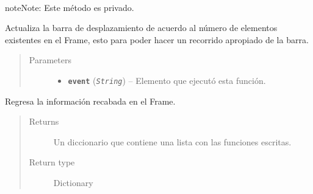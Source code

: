 \documentclass[class=report, crop=false]{standalone}
\begin{document}
\begin{fulllineitems}
\begin{fulllineitems}
\end{fulllineitems}

\begin{fulllineitems}

~

\begin{notice}{note}{Note:}
Este método es privado.
\end{notice}

Actualiza la barra de desplazamiento de acuerdo al número 
de elementos existentes en el Frame, esto para poder hacer 
un recorrido apropiado de la barra.

\begin{quote}\begin{description}
\item[{Parameters}] \leavevmode\begin{itemize}
\item \textbf{\texttt{event}} (\emph{\texttt{String}}) -- Elemento que ejecutó esta función.
\end{itemize}
\end{description}\end{quote}

\end{fulllineitems}

\begin{fulllineitems}

Regresa la información recabada en el Frame.

\begin{quote}\begin{description}
\item[{Returns}] \leavevmode
Un diccionario que contiene una lista con las funciones escritas.
\item[{Return type}] \leavevmode
Dictionary
\end{description}\end{quote}

\end{fulllineitems}

\begin{fulllineitems}

~
\vspace{-0.3cm}


\end{fulllineitems}
\end{fulllineitems}
\end{document}
